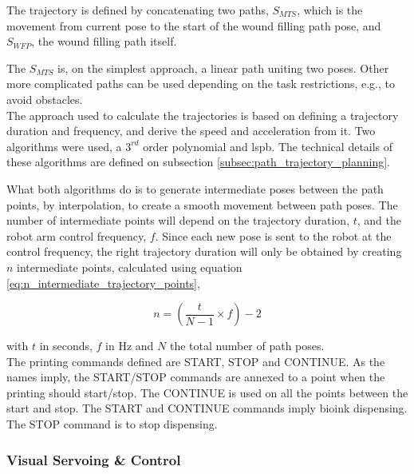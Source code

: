 The trajectory is defined by concatenating two paths, $S_{MTS}$, which is the movement from current pose to the start of the wound filling path pose, and $S_{WFP}$, the wound filling path itself.

The $S_{MTS}$ is, on the simplest approach, a linear path uniting two poses. Other more complicated paths can be used depending on the task restrictions, e.g., to avoid obstacles.\\

The approach used to calculate the trajectories is based on defining a trajectory duration and frequency, and derive the speed and acceleration from it. Two algorithms were used, a $3^{rd}$ order polynomial and \gls{lspb}. The technical details of these algorithms are defined on subsection \ref{subsec:path_trajectory_planning}.

What both algorithms do is to generate intermediate poses between the path points, by interpolation, to create a smooth movement between path poses. The number of intermediate points will depend on the trajectory duration, $t$, and the robot arm control frequency, $f$. Since each new pose is sent to the robot at the control frequency, the right trajectory duration will only be obtained by creating $n$ intermediate points, calculated using equation \ref{eq:n_intermediate_trajectory_points}, 

\begin{equation}
\label{eq:n_intermediate_trajectory_points}
    n = (\frac{t}{N-1} \times f) - 2
\end{equation}

with $t$ in seconds, $f$ in \si{\hertz} and $N$ the total number of path poses.\\

The printing commands defined are START, STOP and CONTINUE. As the names imply, the START/STOP commands are annexed to a point when the printing should start/stop. The CONTINUE is used on all the points between the start and stop. The START and CONTINUE commands imply bioink dispensing. The STOP command is to stop dispensing.


\subsubsection*{Visual Servoing \& Control}
\label{subsubsec:system_architectural_robot_layers_visual_servoing_control}

